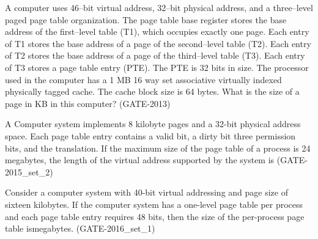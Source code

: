 
\begin{questyle}

  \question  A computer uses 46–bit virtual address, 32–bit physical address, and a three–level paged page table organization.
             The page table base register stores the base address of the first–level table (T1), which occupies
             exactly one page. Each entry of T1 stores the base address of a page of the second–level table (T2).
             Each entry of T2 stores the base address of a page of the third–level table (T3). Each entry of T3
             stores a page table entry (PTE). The PTE is 32 bits in size. The processor used in the computer has
             a 1 MB 16 way set associative virtually indexed physically tagged cache. The cache block size
             is 64 bytes. What is the size of a page in KB in this computer? (GATE-2013)

  \begin{choices}
  \end{choices}

\end{questyle}


\begin{questyle}

  \question   A Computer system implements 8 kilobyte pages and a 32-bit physical address space. Each page table
              entry contains a valid bit, a dirty bit three permission bits, and the translation. If the maximum size
              of the page table of a process is 24 megabytes, the length of the virtual address
              supported by the system is \fillin[] (GATE-2015\_set\_2)
\end{questyle}


\begin{questyle}

  \question  Consider a computer system with 40-bit virtual addressing and page size of sixteen kilobytes.
              If the computer system has a one-level page table per process and each page table entry requires 48 bits,
              then the size of the per-process page table is\fillin[] megabytes. (GATE-2016\_set\_1)

\end{questyle}

